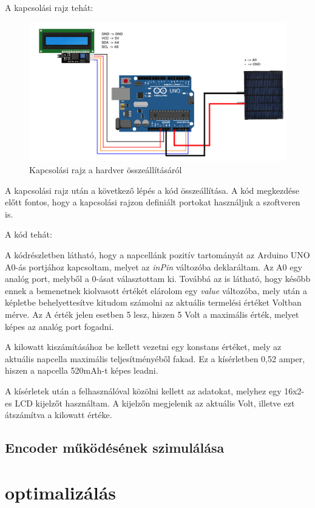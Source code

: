 \documentclass[
]{thesis-ekf}
\theoremstyle{definition}
\theoremstyle{remark}
\begin{document}
			\par A kapcsolási rajz tehát:
			\begin{figure}[h]
				\centering
				\includegraphics[scale=0.30]{solarCalculator}
				\caption{Kapcsolási rajz a hardver összeállításáról}
			\end{figure}
			\par A kapcsolási rajz után a következő lépés a kód összeállítása. A kód megkezdése előtt fontos, hogy a kapcsolási rajzon definiált portokat használjuk a szoftveren is.
			\par A kód tehát:
						
			A kódrészletben látható, hogy a napcellánk pozitív tartományát az Arduino UNO A0-ás portjához kapcsoltam, melyet az \textit{inPin} változóba deklaráltam. Az A0 egy analóg port, melyből a 0-ásat választottam ki. Továbbá az is látható, hogy később ennek a bemenetnek kiolvasott értékét elárolom egy \textit{value} változóba, mely után a képletbe behelyettesítve kitudom számolni az aktuális termelési értéket Voltban mérve. Az A érték jelen esetben 5 lesz, hiszen 5 Volt a maximális érték, melyet képes az analóg port fogadni.
			\par A kilowatt kiszámításához be kellett vezetni egy konstans értéket, mely az aktuális napcella maximális teljesítményéből fakad. Ez a kísérletben 0,52 amper, hiszen a napcella 520mAh-t képes leadni. 
			\par A kísérletek után a felhasználóval közölni kellett az adatokat, melyhez egy 16x2-es LCD kijelzőt használtam. A kijelzőn megjelenik az aktuális Volt, illetve ezt átszámítva a kilowatt értéke.
			
		\subsection{Encoder működésének szimulálása}
	\section{optimalizálás}
\end{document}
